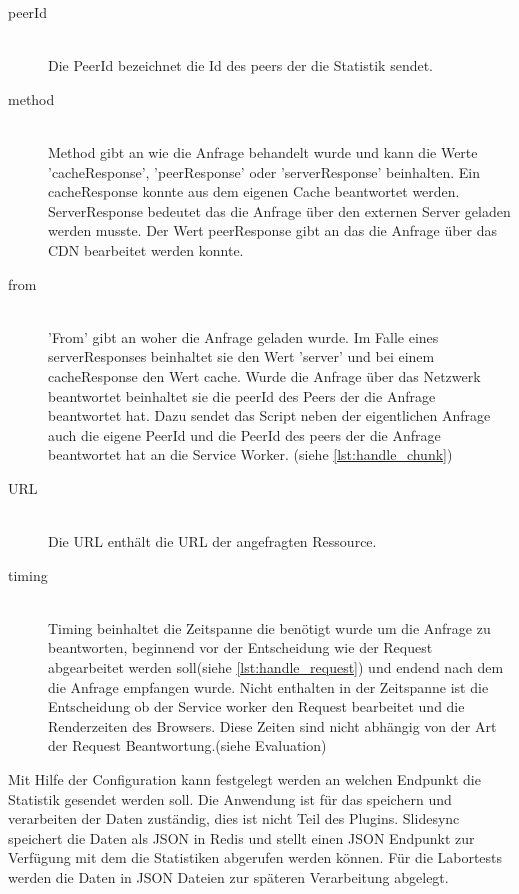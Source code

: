 \begin{description}
\item[peerId]\hfill \\
Die PeerId bezeichnet die Id des peers der die Statistik sendet.
\item[method]\hfill \\
Method gibt an wie die Anfrage behandelt wurde und kann die Werte 'cacheResponse', 'peerResponse' oder 'serverResponse' beinhalten. Ein cacheResponse konnte aus dem eigenen Cache beantwortet werden. ServerResponse bedeutet das die Anfrage über den externen Server geladen werden musste. Der Wert peerResponse gibt an das die Anfrage über das \pTp CDN bearbeitet werden konnte.
\item[from]\hfill \\
 'From' gibt an woher die Anfrage geladen wurde. Im Falle eines serverResponses beinhaltet sie den Wert 'server' und bei einem cacheResponse den Wert cache. Wurde die Anfrage über das \pTp Netzwerk beantwortet beinhaltet sie die peerId des Peers der die Anfrage beantwortet hat. Dazu sendet das Script neben der eigentlichen Anfrage auch die eigene PeerId und die PeerId des peers der die Anfrage beantwortet hat an die Service Worker. (siehe \ref{lst:handle_chunk}) 
\item[URL]\hfill \\
Die URL enthält die URL der angefragten Ressource. 
\item[timing]\hfill \\
Timing beinhaltet die Zeitspanne die benötigt wurde um die Anfrage zu beantworten, beginnend vor der Entscheidung wie der Request abgearbeitet werden soll(siehe \ref{lst:handle_request}) und endend nach dem die Anfrage empfangen wurde. Nicht enthalten in der Zeitspanne ist die Entscheidung ob der Service worker den Request bearbeitet und die Renderzeiten des Browsers. Diese Zeiten sind nicht abhängig von der Art der Request Beantwortung.(siehe Evaluation)
\end{description}
Mit Hilfe der Configuration kann festgelegt werden an welchen Endpunkt die Statistik gesendet werden soll. Die Anwendung ist für das speichern und verarbeiten der Daten zuständig, dies ist nicht Teil des Plugins. Slidesync speichert die Daten als JSON in Redis und stellt einen JSON Endpunkt zur Verfügung mit dem die Statistiken abgerufen werden können. Für die Labortests werden die Daten in JSON Dateien zur späteren Verarbeitung abgelegt.
\begin{listing}[h]
	\inputminted{javascript}{listings/_handle_chunk.js}
	\caption{}
	\label{lst:handle_chunk}
\end{listing}

